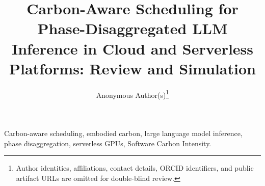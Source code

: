 \documentclass[journal]{IEEEtran}
\begin{document}
\title{Carbon-Aware Scheduling for Phase-Disaggregated LLM Inference in Cloud and Serverless Platforms: Review and Simulation}

\author{Anonymous Author(s)\thanks{Author identities, affiliations, contact details, ORCID identifiers, and public artifact URLs are omitted for double-blind review.}}

\pagestyle{plain}
\maketitle
\thispagestyle{plain}

\begin{abstract}

\end{abstract}

\begin{IEEEkeywords}
Carbon-aware scheduling, embodied carbon, large language model inference, phase disaggregation, serverless GPUs, Software Carbon Intensity.
\end{IEEEkeywords}












\end{document}
